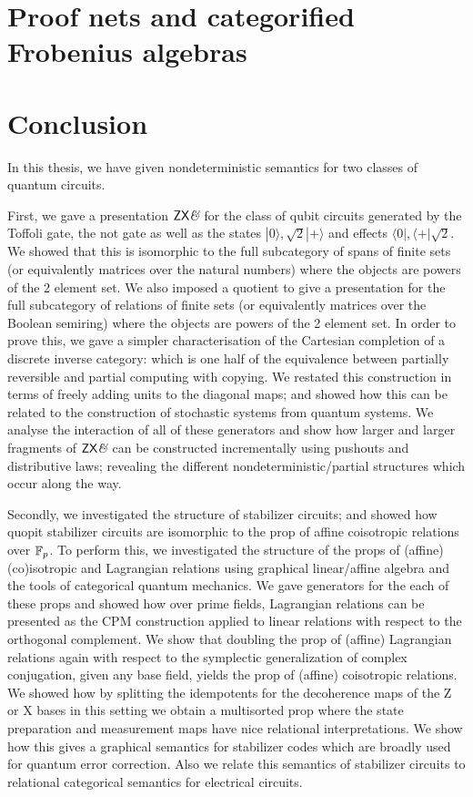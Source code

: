 \documentclass[12pt]{ociamthesis}  %
\begin{document}
\chapter{Proof nets and categorified Frobenius algebras}
\label{chap:grothendieck}


\chapter{Conclusion}
\label{chap:conclusion}


In this thesis, we have given nondeterministic semantics for two classes of quantum circuits.  


First, we gave a presentation $\mathsf{ZX}\textit{\&}$ for the  class of qubit circuits generated by the Toffoli gate, the not gate as well as the states $|0\rangle, \sqrt 2 |+\rangle$ and effects $\langle 0 |, \langle +|\sqrt{2}$.  We showed that this is isomorphic to the full subcategory of spans of finite sets (or equivalently matrices over the natural numbers) where the objects are powers of the 2 element set.  We also imposed a quotient to give a presentation for the full subcategory of relations of finite sets (or equivalently matrices over the Boolean semiring) where the objects are powers of the 2 element set.  In order to prove this, we gave a simpler characterisation of the Cartesian completion of a discrete inverse category: which is one half of the equivalence between partially reversible and partial computing with copying.  We restated this construction in terms of freely adding units to the diagonal maps; and showed how this can be related to the construction of stochastic systems from quantum systems.  We analyse the interaction of all of these generators and show how larger and larger fragments of $\mathsf{ZX}\textit{\&}$ can be constructed incrementally using pushouts and distributive laws; revealing the different nondeterministic/partial structures which occur along the way.


Secondly, we investigated the structure of stabilizer circuits; and showed how quopit stabilizer circuits are isomorphic to the prop of affine coisotropic relations over $\mathbb{F}_p$.  To perform this, we investigated the structure of the props of (affine) (co)isotropic and Lagrangian relations using graphical linear/affine algebra and the tools of categorical quantum mechanics.  We gave generators for the each of these props and showed how over prime fields, Lagrangian relations can be presented as the CPM construction applied to linear relations with respect to the orthogonal complement.  We show that doubling the prop of (affine) Lagrangian relations again with respect to the symplectic generalization of complex conjugation, given any base field, yields the prop of (affine) coisotropic relations.  We showed how by splitting the idempotents for the decoherence maps of the Z or X bases in this setting we obtain a multisorted prop where the state preparation and measurement maps have nice relational interpretations.  We show how this gives a graphical semantics for stabilizer codes which are broadly used for quantum error correction.  Also we relate this semantics of stabilizer circuits to relational categorical semantics for electrical circuits.
\end{document}
